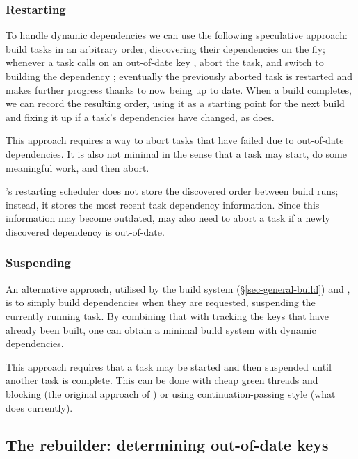 \vspace{-2mm}
\subsubsection{Restarting}\label{sec-restarting}

To handle dynamic dependencies we can use the following speculative approach:
build tasks in an arbitrary order, discovering their dependencies on the fly;
whenever a task calls  on an out-of-date key , abort the task,
and switch to building the dependency ; eventually the previously
aborted task is restarted and makes further progress thanks to  now
being up to date. When a build completes, we can record the resulting order,
using it as a starting point for the next build and fixing it up if a task's
dependencies have changed, as \Excel does.

This approach requires a way to abort tasks that have failed due to out-of-date
dependencies. It is also not minimal in the sense that a task may start, do some
meaningful work, and then abort.

\Bazel's restarting scheduler does not store the discovered order between build
runs; instead, it stores the most recent task dependency information. Since this
information may become outdated, \Bazel may also need to abort a task if a
newly discovered dependency is out-of-date.

\vspace{-2mm}
\subsubsection{Suspending}\label{sec-suspending}

An alternative approach, utilised by the  build system
(\S\ref{sec-general-build}) and \Shake, is to simply build dependencies when
they are requested, suspending the currently running task. By combining that
with tracking the keys that have already been built, one can obtain a minimal
build system with dynamic dependencies.

This approach requires that a task may be started and then suspended until
another task is complete. This can be done with cheap green threads and blocking
(the original approach of \Shake) or using continuation-passing style (what
\Shake does currently).

\subsection{The rebuilder: determining out-of-date keys} \label{sec-out-of-date}

